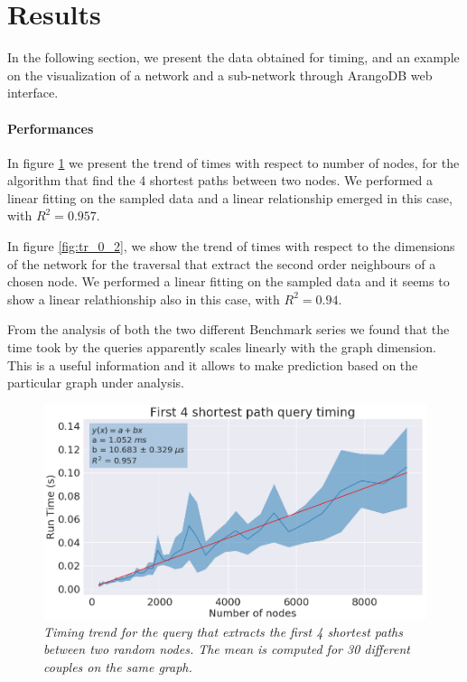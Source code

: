 \documentclass[11pt,twocolumn]{article}
\begin{document}
\section{Results}

In the following section, we present the data obtained for timing, and an example on the visualization of a network and a sub-network through ArangoDB web interface.

\paragraph{Performances}
In figure \ref{fig:sh_paths} we present the trend of times with respect to number of nodes, for the algorithm that find the 4 shortest paths between two nodes. We performed a linear fitting on the sampled data and a linear relationship emerged in this case, with $R^2 = 0.957$.

In figure \ref{fig:tr_0_2}, we show the trend of times with respect to the dimensions of the network for the traversal that extract the second order neighbours of a chosen node. We performed a linear fitting on the sampled data and it seems to show a linear relathionship also in this case, with $R^2 = 0.94$.

From the analysis of both the two different Benchmark series we found that the time took by the queries apparently scales linearly with the graph dimension.
This is a useful information and it allows to make prediction based on the particular graph under analysis.

\begin{figure}[ht!]
  \includegraphics[width=\linewidth]{images/4_shortest_path_timing_readable.png}
  \caption{\small{\textit{Timing trend for the query that extracts the first 4 shortest paths between two random nodes. The mean is computed for 30 different couples on the same graph.}}}
  \label{fig:sh_paths}
\end{figure}
\end{document}
